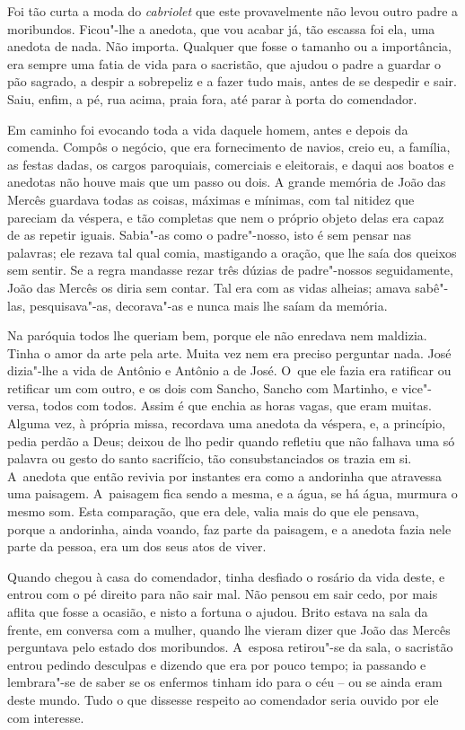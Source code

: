 Foi tão curta a moda do \emph{cabriolet} que este provavelmente não
levou outro padre a moribundos. Ficou"-lhe a anedota, que vou acabar já,
tão escassa foi ela, uma anedota de nada. Não importa. Qualquer que
fosse o tamanho ou a importância, era sempre uma fatia de vida para o
sacristão, que ajudou o padre a guardar o pão sagrado, a despir a
sobrepeliz e a fazer tudo mais, antes de se despedir e sair. Saiu,
enfim, a pé, rua acima, praia fora, até parar à porta do comendador.

Em caminho foi evocando toda a vida daquele homem, antes e depois da
comenda. Compôs o negócio, que era fornecimento de navios, creio eu, a
família, as festas dadas, os cargos paroquiais, comerciais e eleitorais,
e daqui aos boatos e anedotas não houve mais que um passo ou dois. A
grande memória de João das Mercês guardava todas as coisas, máximas e
mínimas, com tal nitidez que pareciam da véspera, e tão completas que
nem o próprio objeto delas era capaz de as repetir iguais. Sabia"-as como
o padre"-nosso, isto é sem pensar nas palavras; ele rezava tal qual
comia, mastigando a oração, que lhe saía dos queixos sem sentir. Se a
regra mandasse rezar três dúzias de padre"-nossos seguidamente, João das
Mercês os diria sem contar. Tal era com as vidas alheias; amava
sabê"-las, pesquisava"-as, decorava"-as e nunca mais lhe saíam da memória.

Na paróquia todos lhe queriam bem, porque ele não enredava nem maldizia.
Tinha o amor da arte pela arte. Muita vez nem era preciso perguntar
nada. José dizia"-lhe a vida de Antônio e Antônio a de José. O~que ele
fazia era ratificar ou retificar um com outro, e os dois com Sancho,
Sancho com Martinho, e vice"-versa, todos com todos. Assim é que enchia
as horas vagas, que eram muitas. Alguma vez, à própria missa, recordava
uma anedota da véspera, e, a princípio, pedia perdão a Deus; deixou de
lho pedir quando refletiu que não falhava uma só palavra ou gesto do
santo sacrifício, tão consubstanciados os trazia em si. A~anedota que
então revivia por instantes era como a andorinha que atravessa uma
paisagem. A~paisagem fica sendo a mesma, e a água, se há água, murmura o
mesmo som. Esta comparação, que era dele, valia mais do que ele pensava,
porque a andorinha, ainda voando, faz parte da paisagem, e a anedota
fazia nele parte da pessoa, era um dos seus atos de viver.

Quando chegou à casa do comendador, tinha desfiado o rosário da vida
deste, e entrou com o pé direito para não sair mal. Não pensou em sair
cedo, por mais aflita que fosse a ocasião, e nisto a fortuna o ajudou.
Brito estava na sala da frente, em conversa com a mulher, quando lhe
vieram dizer que João das Mercês perguntava pelo estado dos moribundos.
A~esposa retirou"-se da sala, o sacristão entrou pedindo desculpas e
dizendo que era por pouco tempo; ia passando e lembrara"-se de saber se
os enfermos tinham ido para o céu -- ou se ainda eram deste mundo. Tudo
o que dissesse respeito ao comendador seria ouvido por ele com
interesse.

